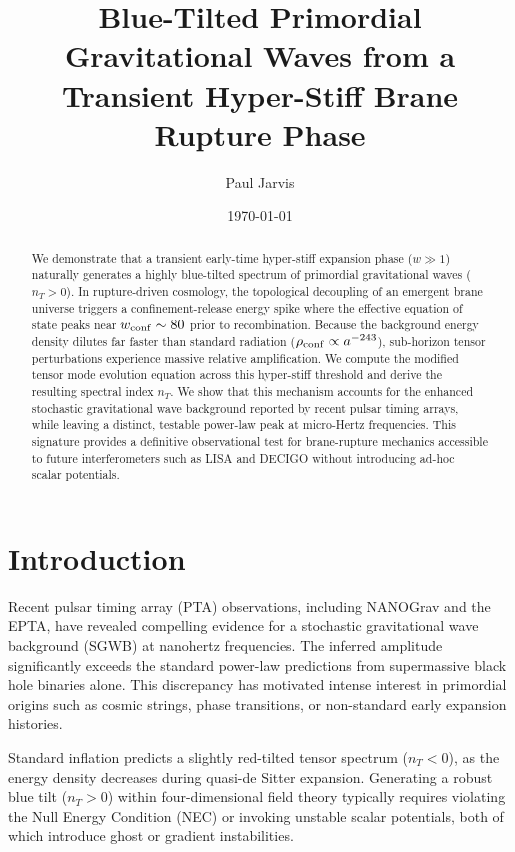 \documentclass[twocolumn, PRD, amsmath, amssymb, aps, nofootinbib]{revtex4-2}
\begin{document}
\title{Blue-Tilted Primordial Gravitational Waves from a Transient Hyper-Stiff Brane Rupture Phase}
\author{Paul Jarvis}
\date{\today}

\begin{abstract}
We demonstrate that a transient early-time hyper-stiff expansion phase ($w \gg 1$) naturally generates a highly blue-tilted spectrum of primordial gravitational waves ($n_T > 0$). In rupture-driven cosmology, the topological decoupling of an emergent brane universe triggers a confinement-release energy spike where the effective equation of state peaks near $w_{\rm conf} \sim 80$ prior to recombination. Because the background energy density dilutes far faster than standard radiation ($\rho_{\rm conf} \propto a^{-243}$), sub-horizon tensor perturbations experience massive relative amplification. We compute the modified tensor mode evolution equation across this hyper-stiff threshold and derive the resulting spectral index $n_T$. We show that this mechanism accounts for the enhanced stochastic gravitational wave background reported by recent pulsar timing arrays, while leaving a distinct, testable power-law peak at micro-Hertz frequencies. This signature provides a definitive observational test for brane-rupture mechanics accessible to future interferometers such as LISA and DECIGO without introducing ad-hoc scalar potentials.
\end{abstract}

\maketitle

\section{Introduction}
Recent pulsar timing array (PTA) observations, including NANOGrav and the EPTA, have revealed compelling evidence for a stochastic gravitational wave background (SGWB) at nanohertz frequencies. The inferred amplitude significantly exceeds the standard power-law predictions from supermassive black hole binaries alone. This discrepancy has motivated intense interest in primordial origins such as cosmic strings, phase transitions, or non-standard early expansion histories.

Standard inflation predicts a slightly red-tilted tensor spectrum ($n_T < 0$), as the energy density decreases during quasi-de Sitter expansion. Generating a robust blue tilt ($n_T > 0$) within four-dimensional field theory typically requires violating the Null Energy Condition (NEC) or invoking unstable scalar potentials, both of which introduce ghost or gradient instabilities.
\end{document}
